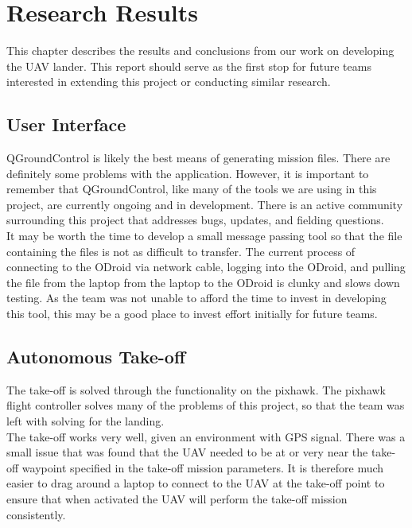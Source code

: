 
\chapter{Research Results}

This chapter describes the results and conclusions from our work on developing the UAV lander. This report should serve as the first stop for future teams interested in extending this project or conducting similar research.\\

\section{User Interface}
QGroundControl is likely the best means of generating mission files. There are definitely some problems with the application. However, it is important to remember that QGroundControl, like many of the tools we are using in this project, are currently ongoing and in development. There is an active community surrounding this project that addresses bugs, updates, and fielding questions.\\

It may be worth the time to develop a small message passing tool so that the file containing the files is not as difficult to transfer. The current process of connecting to the ODroid via network cable, logging into the ODroid, and pulling the file from the laptop from the laptop to the ODroid is clunky and slows down testing. As the team was not unable to afford the time to invest in developing this tool, this may be a good place to invest effort initially for future teams.\\

\section{Autonomous Take-off}
The take-off is solved through the functionality on the pixhawk. The pixhawk flight controller solves many of the problems of this project, so that the team was left with solving for the landing.\\

The take-off works very well, given an environment with GPS signal. There was a small issue that was found that the UAV needed to be at or very near the take-off waypoint specified in the take-off mission parameters. It is therefore much easier to drag around a laptop to connect to the UAV at the take-off point to ensure that when activated the UAV will perform the take-off mission consistently. \\

